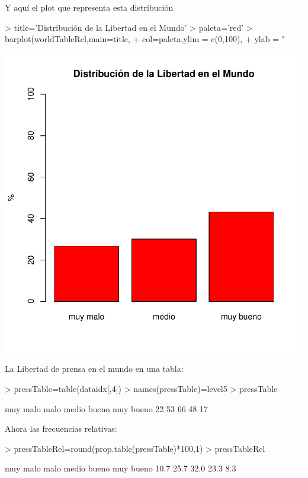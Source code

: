 \documentclass{article}
\begin{document}
Y aquí el plot que representa esta distribución
\begin{Schunk}
\begin{Sinput}
> title='Distribución de la Libertad en el Mundo'
> paleta='red'
> barplot(worldTableRel,main=title,
+         col=paleta,ylim = c(0,100),
+         ylab = "%
\end{Sinput}
\end{Schunk}
\includegraphics{paperVersion_0-worldTableRelPlot}


La Libertad de prensa en el mundo en una tabla:
\begin{Schunk}
\begin{Sinput}
> pressTable=table(dataidx[,4])
> names(pressTable)=level5
> pressTable
\end{Sinput}
\begin{Soutput}
 muy malo      malo     medio     bueno muy bueno 
       22        53        66        48        17 
\end{Soutput}
\end{Schunk}


Ahora las frecuencias relativas:
\begin{Schunk}
\begin{Sinput}
> pressTableRel=round(prop.table(pressTable)*100,1)
> pressTableRel
\end{Sinput}
\begin{Soutput}
 muy malo      malo     medio     bueno muy bueno 
     10.7      25.7      32.0      23.3       8.3 
\end{Soutput}
\end{Schunk}
\end{document}
